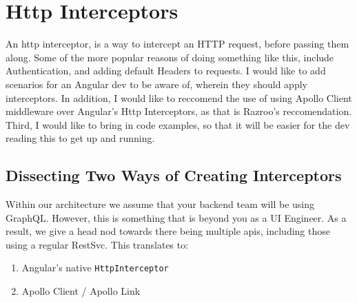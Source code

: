 \section{ Http Interceptors }


An http interceptor, is a way to intercept an HTTP request, before passing them
along. Some of the more popular reasons of doing something like this, include 
Authentication, and adding default Headers to requests. I would like to add 
scenarios for an Angular dev to be aware of, wherein they should apply 
interceptors. In addition, I would like to reccomend the use of using Apollo 
Client middleware over Angular's Http Interceptors, as that is Razroo's 
reccomendation. Third, I would like to bring in code examples, so that it will
be easier for the dev reading this to get up and running.

\subsection{Dissecting Two Ways of Creating Interceptors}
Within our architecture we assume that your backend team will be using GraphQL. 
However, this is something that is beyond you as a UI Engineer. As a result,
we give a head nod towards there being multiple apis, including those using a 
regular RestSvc. This translates to: 
\begin{enumerate}
  \item Angular's native \lstinline{HttpInterceptor}
  \item Apollo Client / Apollo Link
\end{enumerate}

